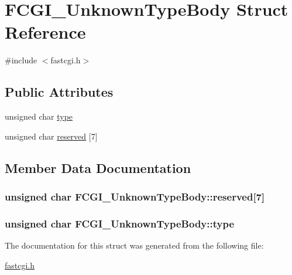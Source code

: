 \hypertarget{structFCGI__UnknownTypeBody}{\section{F\-C\-G\-I\-\_\-\-Unknown\-Type\-Body Struct Reference}
\label{structFCGI__UnknownTypeBody}
}


{\ttfamily \#include $<$fastcgi.\-h$>$}

\subsection*{Public Attributes}
\begin{DoxyCompactItemize}
\item 
unsigned char \hyperlink{structFCGI__UnknownTypeBody_ae8609302165bbfdc38aaab6464d23e83}{type}
\item 
unsigned char \hyperlink{structFCGI__UnknownTypeBody_ae3150fccc5f0619054ebd6505cf7c9de}{reserved} \mbox{[}7\mbox{]}
\end{DoxyCompactItemize}


\subsection{Member Data Documentation}
\hypertarget{structFCGI__UnknownTypeBody_ae3150fccc5f0619054ebd6505cf7c9de}{
\subsubsection[{reserved}]{\setlength{\rightskip}{0pt plus 5cm}unsigned char F\-C\-G\-I\-\_\-\-Unknown\-Type\-Body\-::reserved\mbox{[}7\mbox{]}}}\label{structFCGI__UnknownTypeBody_ae3150fccc5f0619054ebd6505cf7c9de}
\hypertarget{structFCGI__UnknownTypeBody_ae8609302165bbfdc38aaab6464d23e83}{
\subsubsection[{type}]{\setlength{\rightskip}{0pt plus 5cm}unsigned char F\-C\-G\-I\-\_\-\-Unknown\-Type\-Body\-::type}}\label{structFCGI__UnknownTypeBody_ae8609302165bbfdc38aaab6464d23e83}


The documentation for this struct was generated from the following file\-:\begin{DoxyCompactItemize}
\item 
\hyperlink{fastcgi_8h}{fastcgi.\-h}\end{DoxyCompactItemize}
